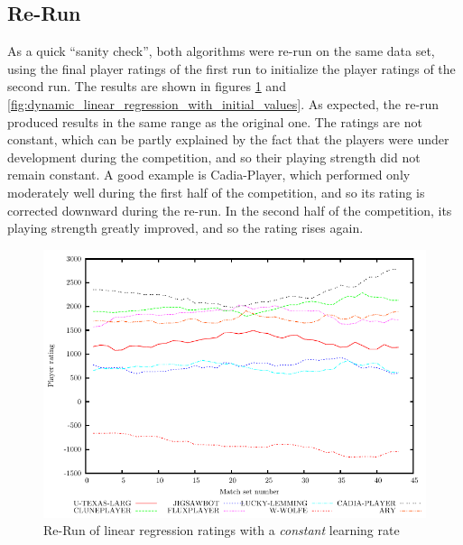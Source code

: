 \documentclass[a4paper,10pt]{article}
\begin{document}
\subsection{Re-Run}
As a quick ``sanity check'', both algorithms were re-run on the same data set,
using the final player ratings of the first run to initialize the player ratings
of the second run. The results are shown in figures
\ref{fig:constant_linear_regression_with_initial_values} and
\ref{fig:dynamic_linear_regression_with_initial_values}. As expected, the re-run
produced results in the same range as the original one. The ratings are not
constant, which can be partly explained by the fact that the players were under
development during the competition, and so their playing strength did not remain
constant. A good example is Cadia-Player, which performed only moderately well
during the first half of the competition, and so its rating is corrected
downward during the re-run. In the second half of the competition, its playing
strength greatly improved, and so the rating rises again.

\begin{figure}
 \centering
 \includegraphics[width=\textwidth]{constant_linear_regression_1_0_with_initial_values}
 \caption{Re-Run of linear regression ratings with a \textit{constant} learning rate}
 \label{fig:constant_linear_regression_with_initial_values}
\end{figure}
\end{document}
